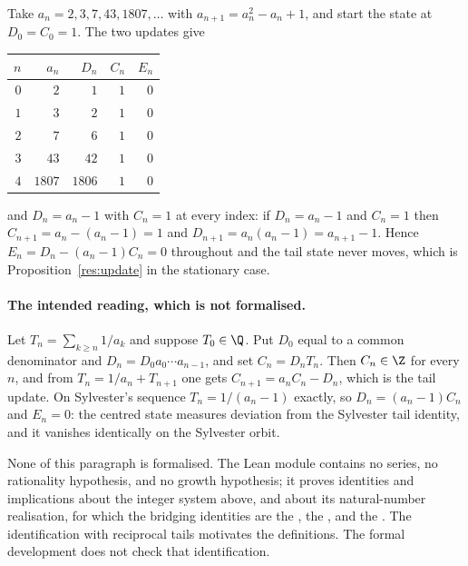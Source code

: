 \begin{example}\label{ex:sylvester}
Take $a_n=2,3,7,43,1807,\ldots$ with $a_{n+1}=a_n^{2}-a_n+1$, and start the
state at $D_0=C_0=1$.  The two updates give

\begin{center}
\begin{tabular}{@{}rrrrr@{}}
\toprule
$n$ & $a_n$ & $D_n$ & $C_n$ & $E_n$\\
\midrule
$0$ & $2$ & $1$ & $1$ & $0$\\
$1$ & $3$ & $2$ & $1$ & $0$\\
$2$ & $7$ & $6$ & $1$ & $0$\\
$3$ & $43$ & $42$ & $1$ & $0$\\
$4$ & $1807$ & $1806$ & $1$ & $0$\\
\bottomrule
\end{tabular}
\end{center}

\noindent and $D_n=a_n-1$ with $C_n=1$ at every index: if $D_n=a_n-1$ and
$C_n=1$ then $C_{n+1}=a_n-(a_n-1)=1$ and $D_{n+1}=a_n(a_n-1)=a_{n+1}-1$.
Hence $E_n=D_n-(a_n-1)C_n=0$ throughout and the tail state never moves, which
is Proposition~\ref{res:update} in the stationary case.
\end{example}

\paragraph{The intended reading, which is not formalised.}
Let $T_n=\sum_{k\ge n}1/a_k$ and suppose $T_0\in\Q$.  Put $D_0$ equal to a
common denominator and $D_n=D_0a_0\cdots a_{n-1}$, and set $C_n=D_nT_n$.  Then
$C_n\in\Z$ for every $n$, and from $T_n=1/a_n+T_{n+1}$ one gets
$C_{n+1}=a_nC_n-D_n$, which is the tail update.  On Sylvester's sequence
$T_n=1/(a_n-1)$ exactly, so $D_n=(a_n-1)C_n$ and $E_n=0$: the centred state
measures deviation from the Sylvester tail identity, and it vanishes
identically on the Sylvester orbit.

None of this paragraph is formalised.  The Lean module contains no series, no
rationality hypothesis, and no growth hypothesis; it proves identities and
implications about the integer system above, and about its natural-number
realisation, for which the bridging identities are the
, the
, and the
.  The identification with reciprocal tails motivates the
definitions.  The formal development does not check that identification.

